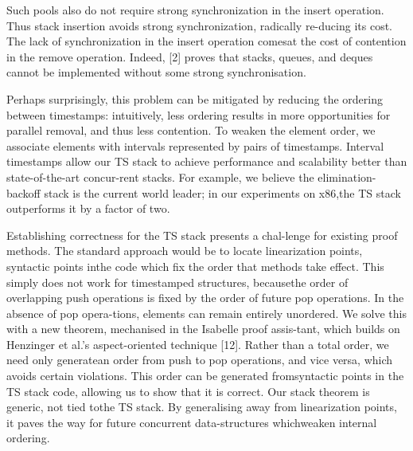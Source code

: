Such pools also do not require strong synchronization in the insert operation.
Thus stack insertion avoids strong synchronization, radically re-ducing its cost.
The lack of synchronization in the insert operation comesat the cost of
contention in the remove operation. 
Indeed, [2] proves that stacks, queues, and deques cannot be implemented
without some strong synchronisation. 

Perhaps surprisingly, this problem can be mitigated by reducing the ordering
between timestamps: intuitively, less ordering results in more opportunities
for parallel removal, and thus less contention. 
To weaken the element order, we associate elements with intervals represented
by pairs of timestamps.
Interval timestamps allow our TS stack to achieve performance and scalability
better than state-of-the-art concur-rent stacks. 
For example, we believe the elimination-backoff stack is the current world
leader; in our experiments on x86,the TS stack outperforms it by a factor of
two.

Establishing correctness for the TS stack presents a chal-lenge for existing proof methods. The standard approach
would be to locate linearization points, syntactic points inthe code which fix the order that methods take effect. This
simply does not work for timestamped structures, becausethe order of overlapping push operations is fixed by the order of future pop operations. In the absence of pop opera-tions, elements can remain entirely unordered. We solve this
with a new theorem, mechanised in the Isabelle proof assis-tant, which builds on Henzinger et al.'s aspect-oriented technique [12]. Rather than a total order, we need only generatean order from push to pop operations, and vice versa, which
avoids certain violations. This order can be generated fromsyntactic points in the TS stack code, allowing us to show
that it is correct. Our stack theorem is generic, not tied tothe TS stack. By generalising away from linearization points,
it paves the way for future concurrent data-structures whichweaken internal ordering.

